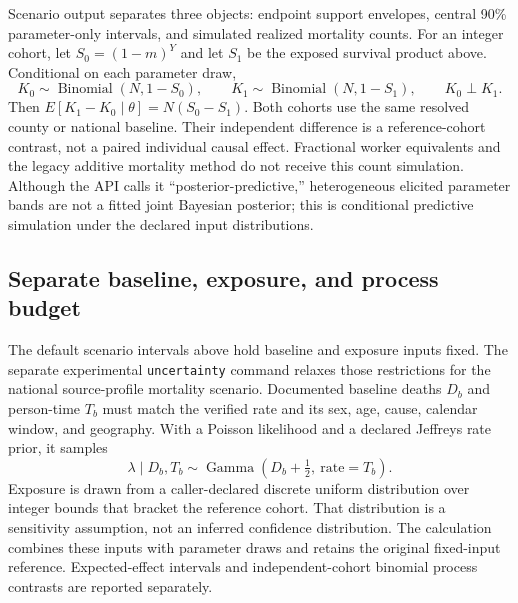 \documentclass[10pt]{article}
\begin{document}
Scenario output separates three objects: endpoint support envelopes,
central 90\% parameter-only intervals, and simulated realized mortality
counts. For an integer cohort, let $S_0=(1-m)^Y$ and let $S_1$ be the
exposed survival product above. Conditional on each parameter draw,
\begin{equation}
 K_0\sim\operatorname{Binomial}(N,1-S_0),\qquad
 K_1\sim\operatorname{Binomial}(N,1-S_1),\qquad K_0\perp K_1.
\end{equation}
Then $E[K_1-K_0\mid\theta]=N(S_0-S_1)$. Both cohorts use the same
resolved county or national baseline. Their independent difference is a
reference-cohort contrast, not a paired individual causal effect.
Fractional worker equivalents and the legacy additive mortality method
do not receive this count simulation. Although the API calls it
``posterior-predictive,'' heterogeneous elicited parameter bands are not
a fitted joint Bayesian posterior; this is conditional predictive
simulation under the declared input distributions.

\subsection{Separate baseline, exposure, and process budget}
The default scenario intervals above hold baseline and exposure inputs
fixed. The separate experimental \texttt{uncertainty} command relaxes
those restrictions for the national source-profile mortality scenario.
Documented baseline deaths $D_b$ and person-time $T_b$ must match the
verified rate and its sex, age, cause, calendar window, and geography.
With a Poisson likelihood and a declared Jeffreys rate prior, it samples
\begin{equation}
 \lambda\mid D_b,T_b\sim
 \operatorname{Gamma}(D_b+\tfrac12,\ \mathrm{rate}=T_b).
\end{equation}
Exposure is drawn from a caller-declared discrete uniform distribution
over integer bounds that bracket the reference cohort. That distribution
is a sensitivity assumption, not an inferred confidence distribution.
The calculation combines these inputs with parameter draws and retains
the original fixed-input reference. Expected-effect intervals and
independent-cohort binomial process contrasts are reported separately.
\end{document}
